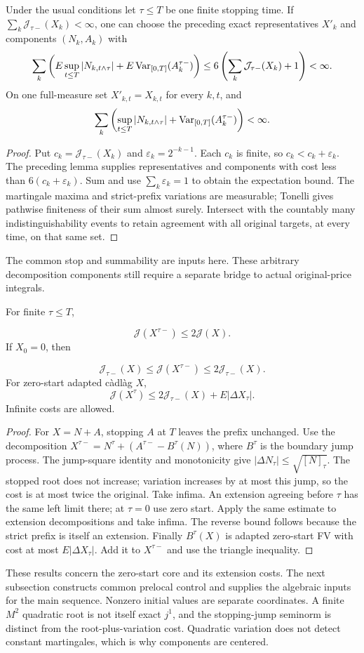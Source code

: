 \begin{lemma}
Under the usual conditions let $\tau\leq T$ be one finite stopping time.
If $\sum_k\mathcal J_{\tau-}(X_k)<\infty$, one can choose the preceding
exact representatives $X'_k$ and components $(N_k,A_k)$ with
\[
 \sum_k\left(E\sup_{t\leq T}|N_{k,t\wedge\tau}|+
 E\operatorname{Var}_{[0,T]}(A_k^{\tau-})\right)
 \leq6\left(\sum_k\mathcal J_{\tau-}(X_k)+1\right)<\infty.
\]
On one full-measure set $X'_{k,t}=X_{k,t}$ for every $k,t$, and
\[
 \sum_k\left(\sup_{t\leq T}|N_{k,t\wedge\tau}|+
 \operatorname{Var}_{[0,T]}(A_k^{\tau-})\right)<\infty.
\]
\end{lemma}
\begin{proof}
Put $c_k=\mathcal J_{\tau-}(X_k)$ and $\varepsilon_k=2^{-k-1}$.
Each $c_k$ is finite, so $c_k<c_k+\varepsilon_k$. The preceding lemma
supplies representatives and components with cost less than
$6(c_k+\varepsilon_k)$.
Sum and use $\sum_k\varepsilon_k=1$ to obtain the expectation bound.
The martingale maxima and strict-prefix variations are measurable;
Tonelli gives pathwise finiteness of their sum almost surely.
Intersect with the countably many indistinguishability events to retain
agreement with all original targets, at every time, on that same set.
\end{proof}
The common stop and summability are inputs here. These arbitrary decomposition
components still require a separate bridge to actual original-price integrals.
\begin{lemma}
For finite $\tau\leq T$,

\[
 \mathcal J(X^{\tau-})\leq2\mathcal J(X).
\]
If $X_0=0$, then

\[
 \mathcal J_{\tau-}(X)\leq\mathcal J(X^{\tau-})\leq2\mathcal J_{\tau-}(X).
\]
For zero-start adapted c\`adl\`ag $X$,
\[
 \mathcal J(X^\tau)\leq2\mathcal J_{\tau-}(X)+E|\Delta X_\tau|.
\]
Infinite costs are allowed.
\end{lemma}
\begin{proof}
For $X=N+A$, stopping $A$ at $T$ leaves the prefix unchanged.
Use the decomposition
$X^{\tau-}=N^\tau+(A^{\tau-}-B^\tau(N))$, where $B^\tau$ is the boundary
jump process. The jump-square identity and monotonicity give
$|\Delta N_\tau|\leq\sqrt{[N]_\tau}$.
The stopped root does not increase; variation increases by at most this
jump, so the cost is at most twice the original. Take infima.
An extension agreeing before $\tau$ has the same left limit there; at
$\tau=0$ use zero start. Apply the same estimate to extension decompositions
and take infima. The reverse bound follows because the strict prefix is
itself an extension. Finally $B^\tau(X)$ is adapted zero-start FV with
cost at most $E|\Delta X_\tau|$. Add it to $X^{\tau-}$ and use the triangle
inequality.
\end{proof}
These results concern the zero-start core and its extension costs. The next
subsection constructs common prelocal control and supplies the algebraic
inputs for the main sequence. Nonzero initial values are separate coordinates.
A finite $M^2$ quadratic root is not itself exact $j^1$, and the stopping-jump
seminorm is distinct from the root-plus-variation cost. Quadratic variation
does not detect constant martingales, which is why components are centered.
